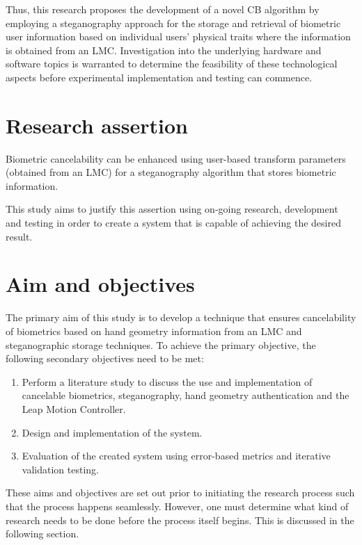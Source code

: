 Thus, this research proposes the development of a novel CB algorithm by employing a steganography approach for the storage and retrieval of biometric user information based on individual users’ physical traits where the information is obtained from an LMC. Investigation into the underlying hardware and software topics is warranted to determine the feasibility of these technological aspects before experimental implementation and testing can commence.


\section{Research assertion}  %
\label{section1.3}

Biometric cancelability can be enhanced using user-based transform parameters (obtained from an LMC) for a steganography algorithm that stores biometric information.

This study aims to justify this assertion using on-going research, development and testing in order to create a system that is capable of achieving the desired result.

\section{Aim and objectives}  %
\label{section1.4}
The primary aim of this study is to develop a technique that ensures cancelability of biometrics based on hand geometry information from an LMC and steganographic storage techniques.
To achieve the primary objective, the following secondary objectives need to be met:

\begin{enumerate}[label=\roman*.]
\item Perform a literature study to discuss the use and implementation of cancelable biometrics, steganography, hand geometry authentication and the Leap Motion Controller.
\item Design and implementation of the system.
\item Evaluation of the created system using error-based metrics and iterative validation testing.
\end{enumerate}

These aims and objectives are set out prior to initiating the research process such that the process happens seamlessly. However, one must determine what kind of research needs to be done before the process itself begins. This is discussed in the following section.

